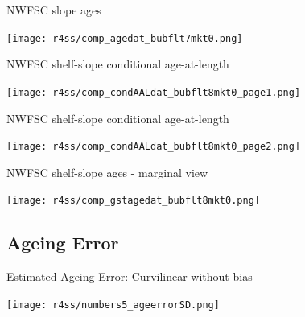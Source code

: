 \documentclass[pdf]{beamer}\usepackage[]{graphicx}\usepackage[]{color}
\begin{document}
\begin{frame}{NWFSC slope ages}
  \begin{center}
    \texttt{[image: r4ss/comp\_agedat\_bubflt7mkt0.png]}
  \end{center}
\end{frame}

\begin{frame}{NWFSC shelf-slope conditional age-at-length}
  \begin{center}
    \texttt{[image: r4ss/comp\_condAALdat\_bubflt8mkt0\_page1.png]}
  \end{center}
\end{frame}

\begin{frame}{NWFSC shelf-slope conditional age-at-length}
  \begin{center}
    \texttt{[image: r4ss/comp\_condAALdat\_bubflt8mkt0\_page2.png]}
  \end{center}
\end{frame}

\begin{frame}{NWFSC shelf-slope ages - marginal view}
  \begin{center}
    \texttt{[image: r4ss/comp\_gstagedat\_bubflt8mkt0.png]}
  \end{center}
\end{frame}


\subsection{Ageing Error}
\begin{frame}{Estimated Ageing Error: Curvilinear without bias}
  \begin{center}
    \texttt{[image: r4ss/numbers5\_ageerrorSD.png]}
  \end{center}

\end{frame}
\end{document}
